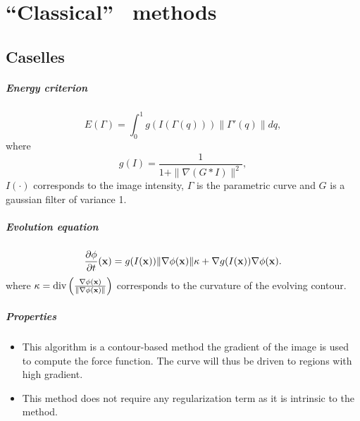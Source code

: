 
\newpage

\fancyhead{} %
\fancyhead[LE,RO]{\nouppercase\leftmark}
\fancyhead[LO,RE]{\nouppercase\rightmark}

\chapter{``Classical'' \ls~methods}
\label{chap:ls-methods}

\section[Caselles]{Caselles \cite{Caselles1997}}
\label{sec:Caselles}

\paragraph{Energy criterion}
\begin{equation}
	\label{eq:NRJ_caselles}
	E(\Gamma) = \int_0^1 g(I(\Gamma(q))) \|\Gamma'(q)\| dq,
\end{equation}
where
\begin{equation}
	\label{eq:g_caselles}
	g(I) = \frac{1}{1 + \| \nabla (G \ast I) \|^2},
\end{equation}
$I(\cdot)$ corresponds to the image intensity, $\Gamma$ is the parametric curve and $G$ is a gaussian filter of variance 1.

\paragraph{Evolution equation}
\begin{equation}
	\label{eq:evol_caselles}
	\frac{\partial \phi}{\partial t}(\mathbf{x}) = g(I(\mathbf{x})) \| \nabla \phi(\mathbf{x}) \| \kappa + \nabla g(I(\mathbf{x})) \nabla \phi(\mathbf{x}).
\end{equation}
where $\kappa = \text{div}\left(\frac{\nabla \phi(\mathbf{x})}{\| \nabla \phi(\mathbf{x}) \|} \right)$ corresponds to the curvature of the evolving contour.

\paragraph{Properties}

\begin{itemize}
	\item This algorithm is a contour-based method \ie the gradient of the image is used to compute the force function. The curve will thus be driven to regions with high gradient.
	\item This method does not require any regularization term as it is intrinsic to the method.
\end{itemize}


